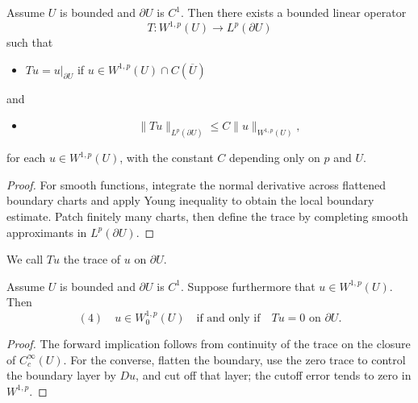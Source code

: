 \begin{theorem}
\label{thm:trace-theorem}
Assume $U$ is bounded and $\partial U$ is $C^1$. Then there exists a bounded linear operator
$$T : W^{1,p}(U) \to L^p(\partial U)$$
such that
\begin{itemize}
\item[(i)] $Tu = u|_{\partial U}$ if $u \in W^{1,p}(U) \cap C(\overline{U})$
\end{itemize}
and
\begin{itemize}
\item[(ii)] $$\|Tu\|_{L^p(\partial U)} \le C\|u\|_{W^{1,p}(U)},$$
\end{itemize}
for each $u \in W^{1,p}(U)$, with the constant $C$ depending only on $p$ and $U$.
\end{theorem}

\begin{proof}
\sketch For smooth functions, integrate the normal derivative across flattened boundary charts and apply Young inequality to obtain the local boundary estimate. Patch finitely many charts, then define the trace by completing smooth approximants in $L^p(\partial U)$.
\end{proof}

\begin{definition}
\label{def:trace-operator}
We call $Tu$ the trace of $u$ on $\partial U$.
\end{definition}

\begin{theorem}
\label{thm:trace-zero-characterization}
Assume $U$ is bounded and $\partial U$ is $C^1$. Suppose furthermore that $u \in W^{1,p}(U)$. Then
$$(4) \quad u \in W_0^{1,p}(U) \quad \text{if and only if} \quad Tu = 0 \text{ on } \partial U.$$
\end{theorem}

\begin{proof}
\sketch The forward implication follows from continuity of the trace on the closure of $C_c^\infty(U)$. For the converse, flatten the boundary, use the zero trace to control the boundary layer by $Du$, and cut off that layer; the cutoff error tends to zero in $W^{1,p}$.
\end{proof}

